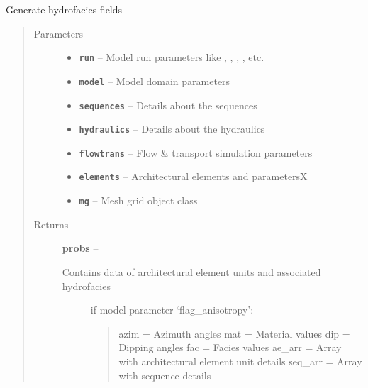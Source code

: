 \documentclass[letterpaper,10pt,english]{sphinxmanual}
\begin{document}
\begin{fulllineitems}
\label{hyvr:hyvr.hyvr.sim.facies}
Generate hydrofacies fields
\begin{quote}\begin{description}
\item[{Parameters}] \leavevmode\begin{itemize}
\item {} 
\textbf{\texttt{run}} -- Model run parameters like , , , , etc.

\item {} 
\textbf{\texttt{model}} -- Model domain parameters

\item {} 
\textbf{\texttt{sequences}} -- Details about the sequences

\item {} 
\textbf{\texttt{hydraulics}} -- Details about the hydraulics

\item {} 
\textbf{\texttt{flowtrans}} -- Flow \& transport simulation parameters

\item {} 
\textbf{\texttt{elements}} -- Architectural elements and parametersX

\item {} 
\textbf{\texttt{mg}} -- Mesh grid object class

\end{itemize}

\item[{Returns}] \leavevmode

\textbf{probs} --
\begin{description}
\item[{Contains data of architectural element units and associated hydrofacies}] \leavevmode
if model parameter `flag\_anisotropy':
\begin{quote}

azim =                              Azimuth angles
mat =                               Material values
dip =                               Dipping angles
fac =                               Facies values
ae\_arr =                    Array with architectural element unit details
seq\_arr =                   Array with sequence details
\end{quote}


\end{description}
\end{description}
\end{quote}
\end{fulllineitems}
\end{document}
